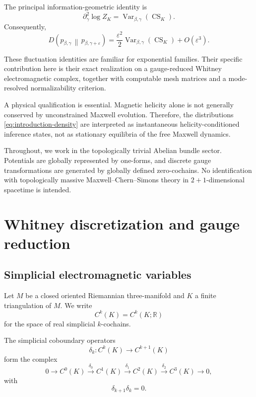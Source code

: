 \documentclass[11pt]{article}
\theoremstyle{definition}
\theoremstyle{remark}
\newcommand{\R}{\mathbb{R}}
\newcommand{\CS}{\operatorname{CS}}
\newcommand{\Var}{\operatorname{Var}}
\begin{document}
The principal information-geometric identity is
\begin{equation}
\partial_\gamma^2\log Z_K
=
\Var_{\beta,\gamma}(\CS_K).
\label{eq:introduction-fisher}
\end{equation}
Consequently,
\begin{equation}
D\left(
p_{\beta,\gamma}
\,\middle\|\,
p_{\beta,\gamma+\varepsilon}
\right)
=
\frac{\varepsilon^2}{2}
\Var_{\beta,\gamma}(\CS_K)
+
O(\varepsilon^3).
\label{eq:introduction-relative}
\end{equation}

These fluctuation identities are familiar for exponential
families. Their specific contribution here is their exact
realization on a gauge-reduced Whitney electromagnetic
complex, together with computable mesh matrices and a
mode-resolved normalizability criterion.

A physical qualification is essential. Magnetic helicity alone
is not generally conserved by unconstrained Maxwell evolution.
Therefore, the distributions
\eqref{eq:introduction-density} are interpreted as
instantaneous helicity-conditioned inference states, not as
stationary equilibria of the free Maxwell dynamics.

Throughout, we work in the topologically trivial Abelian
bundle sector. Potentials are globally represented by
one-forms, and discrete gauge transformations are generated by
globally defined zero-cochains. No identification with
topologically massive Maxwell--Chern--Simons theory in
\(2+1\)-dimensional spacetime is intended.

\section{Whitney discretization and gauge reduction}

\subsection{Simplicial electromagnetic variables}

Let \(M\) be a closed oriented Riemannian three-manifold and
\(K\) a finite triangulation of \(M\). We write
\begin{equation}
C^k(K)
=
C^k(K;\R)
\end{equation}
for the space of real simplicial \(k\)-cochains.

The simplicial coboundary operators
\begin{equation}
\delta_k:
C^k(K)
\longrightarrow
C^{k+1}(K)
\end{equation}
form the complex
\begin{equation}
0
\longrightarrow
C^0(K)
\xrightarrow{\delta_0}
C^1(K)
\xrightarrow{\delta_1}
C^2(K)
\xrightarrow{\delta_2}
C^3(K)
\longrightarrow
0,
\label{eq:cochain-complex}
\end{equation}
with
\begin{equation}
\delta_{k+1}\delta_k=0.
\label{eq:delta-square}
\end{equation}
\end{document}
